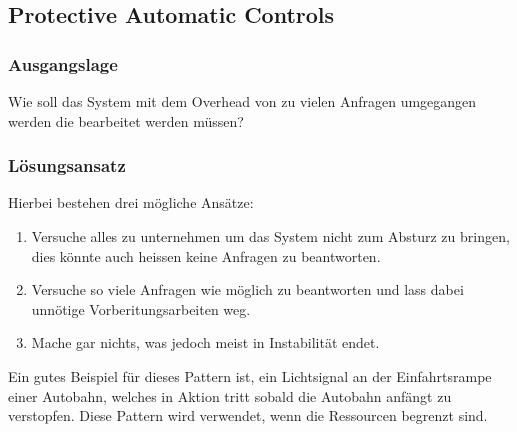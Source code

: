 \subsection{Protective Automatic Controls}

\subsubsection*{Ausgangslage}

Wie soll das System mit dem Overhead von zu vielen Anfragen umgegangen werden die bearbeitet werden müssen?

\subsubsection*{Lösungsansatz}

Hierbei bestehen drei mögliche Ansätze:
\begin{enumerate}
	\item Versuche alles zu unternehmen um das System nicht zum Absturz zu bringen, dies könnte auch heissen keine Anfragen zu beantworten.
	\item Versuche so viele Anfragen wie möglich zu beantworten und lass dabei unnötige Vorberitungsarbeiten weg.
	\item Mache gar nichts, was jedoch meist in Instabilität endet.
\end{enumerate}

Ein gutes Beispiel für dieses Pattern ist, ein Lichtsignal an der Einfahrtsrampe einer Autobahn, welches in Aktion tritt sobald die Autobahn anfängt zu verstopfen. Diese Pattern wird verwendet, wenn die Ressourcen begrenzt sind.

